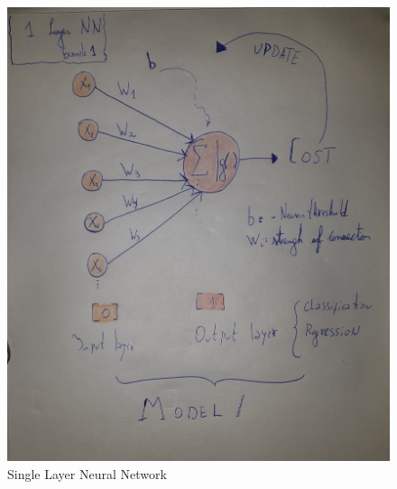 \begin{figure}
 \centering
 \includegraphics[angle=-90,origin=c, width=\textwidth]{1L-NN.jpg}
 \caption{Single Layer Neural Network}
 \label{fig:single}
\end{figure}


